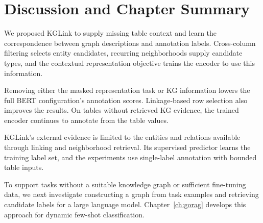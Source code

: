 \section{Discussion and Chapter Summary}
\label{sec:kglink:discussion}

We proposed KGLink to supply missing table context and learn the correspondence between graph descriptions and annotation labels. Cross-column filtering selects entity candidates, recurring neighborhoods supply candidate types, and the contextual representation objective trains the encoder to use this information.

Removing either the masked representation task or KG information lowers the full BERT configuration's annotation scores. Linkage-based row selection also improves the results. On tables without retrieved KG evidence, the trained encoder continues to annotate from the table values.

KGLink's external evidence is limited to the entities and relations available through linking and neighborhood retrieval. Its supervised predictor learns the training label set, and the experiments use single-label annotation with bounded table inputs.

To support tasks without a suitable knowledge graph or sufficient fine-tuning data, we next investigate constructing a graph from task examples and retrieving candidate labels for a large language model. Chapter~\ref{ch:gorag} develops this approach for dynamic few-shot classification.
